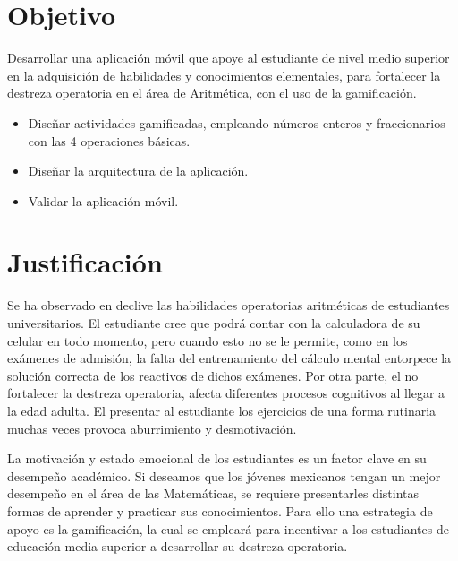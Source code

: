 \documentclass{article}
\begin{document}
\section{Objetivo}

Desarrollar una aplicación móvil que apoye al estudiante de nivel medio superior en la 
adquisición de habilidades y conocimientos elementales, para fortalecer la destreza 
operatoria en el área de Aritmética, con el uso de la gamificación.

\begin{itemize}
	\item Diseñar actividades gamificadas, empleando números enteros y fraccionarios con las 4 operaciones básicas.
	\item Diseñar la arquitectura de la aplicación.
	\item Validar la aplicación móvil. 
\end{itemize}

\section{Justificación}

Se ha observado en declive las habilidades operatorias aritméticas de estudiantes 
universitarios\cite{tariq2002decline,carpenter2017psychology,huang2013gamification}. 
El estudiante cree que podrá contar con la calculadora de su celular en todo momento, 
pero cuando esto no se le permite, como en los exámenes de admisión, la falta del 
entrenamiento del cálculo mental entorpece la solución correcta de los reactivos 
de dichos exámenes. Por otra parte, el no fortalecer la destreza operatoria, afecta 
diferentes procesos cognitivos al llegar a la edad adulta\cite{martin2003loss}.
El presentar al estudiante los ejercicios de una forma rutinaria muchas veces provoca 
aburrimiento y desmotivación. 


La motivación y estado emocional de los estudiantes es un factor clave en su desempeño 
académico\cite{larrazolo2013habilidades,ryan1997should}. Si deseamos que los jóvenes 
mexicanos tengan un mejor desempeño en el área de las Matemáticas, se requiere presentarles 
distintas formas de aprender y practicar sus conocimientos. Para ello una estrategia de 
apoyo es la gamificación, la cual se empleará para incentivar a los estudiantes de educación 
media superior a desarrollar su destreza operatoria.
\end{document}
